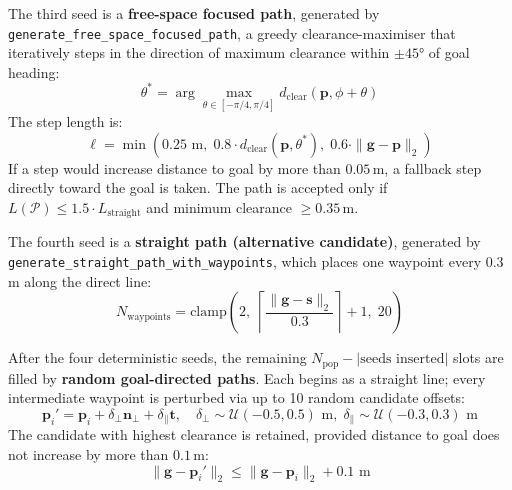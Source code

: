 \documentclass[lettersize,journal]{IEEEtran}
\begin{document}
The third seed is a \textbf{free-space focused path}, generated by 
\texttt{generate\_free\_space\_focused\_path}, a greedy clearance-maximiser 
that iteratively steps in the direction of maximum clearance within $\pm 45°$ 
of goal heading:
\begin{equation}
  \theta^* = \arg\max_{\theta \in [-\pi/4, \pi/4]}
             d_{\mathrm{clear}}(\mathbf{p}, \phi + \theta)
  \label{eq:free_space_search}
\end{equation}
The step length is:
\begin{equation}
  \ell = \min\!\left(0.25\text{ m},\;
                    0.8 \cdot d_{\mathrm{clear}}(\mathbf{p}, \theta^*),\;
                    0.6 \cdot \|\mathbf{g} - \mathbf{p}\|_2\right)
  \label{eq:free_space_step}
\end{equation}
If a step would increase distance to goal by more than $0.05$\,m, a fallback 
step directly toward the goal is taken. The path is accepted only if 
$L(\mathcal{P}) \le 1.5 \cdot L_{\mathrm{straight}}$ and minimum clearance 
$\geq 0.35$\,m.

The fourth seed is a \textbf{straight path (alternative candidate)}, generated 
by \texttt{generate\_straight\_path\_with\_waypoints}, which places one waypoint 
every $0.3$\,m along the direct line:
\begin{equation}
  N_{\mathrm{waypoints}} = \text{clamp}\!\left(2,\;
                          \left\lceil \frac{\|\mathbf{g}-\mathbf{s}\|_2}{0.3}\right\rceil + 1,\;
                          20\right)
  \label{eq:straight_waypoint_count}
\end{equation}

After the four deterministic seeds, the remaining $N_{\mathrm{pop}} - |\text{seeds inserted}|$ 
slots are filled by \textbf{random goal-directed paths}. Each begins as a 
straight line; every intermediate waypoint is perturbed via up to 10 random 
candidate offsets:
\begin{equation}
  \mathbf{p}_i' = \mathbf{p}_i + \delta_\perp \mathbf{n}_\perp +
                  \delta_\parallel \mathbf{t},
  \quad \delta_\perp \sim \mathcal{U}(-0.5, 0.5)\text{ m},\;
  \delta_\parallel \sim \mathcal{U}(-0.3, 0.3)\text{ m}
  \label{eq:random_perturb}
\end{equation}
The candidate with highest clearance is retained, provided distance to goal 
does not increase by more than $0.1$\,m:
\begin{equation}
  \|\mathbf{g} - \mathbf{p}_i'\|_2 \le \|\mathbf{g} - \mathbf{p}_i\|_2 + 0.1\text{ m}
  \label{eq:random_progress}
\end{equation}
\end{document}
